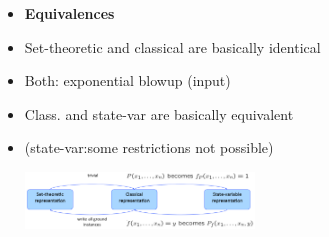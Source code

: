 \begin{itemize}
\item \textbf{Equivalences}
\item Set-theoretic and classical are basically identical
\item Both: exponential blowup (input)
\item Class. and state-var are basically equivalent 
\item (state-var:some restrictions not possible)

\includegraphics[width=0.48\textwidth]{./img/conversions.png}

\end{itemize}